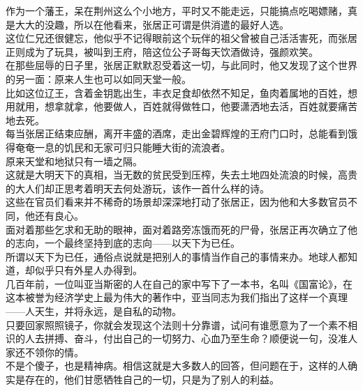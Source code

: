 \begin{multicols}{\theparacolNo}
作为一个藩王，呆在荆州这么个小地方，平时又不能走远，只能搞点吃喝嫖赌，真是大大的没趣，所以在他看来，张居正可谓是供消遣的最好人选。\\

这位仁兄还很健忘，他似乎不记得眼前这个玩伴的祖父曾被自己活活害死，而张居正则成为了玩具，被叫到王府，陪这位公子哥每天饮酒做诗，强颜欢笑。\\

在那些屈辱的日子里，张居正默默忍受着这一切，与此同时，他又发现了这个世界的另一面：原来人生也可以如同天堂一般。\\

比如这位辽王，含着金钥匙出生，丰衣足食却依然不知足，鱼肉着属地的百姓，想用就用，想拿就拿，他要做人，百姓就得做牲口，他要潇洒地去活，百姓就要痛苦地去死。\\

每当张居正结束应酬，离开丰盛的酒席，走出金碧辉煌的王府门口时，总能看到饿得奄奄一息的饥民和无家可归只能睡大街的流浪者。\\

原来天堂和地狱只有一墙之隔。\\

这就是大明天下的真相，当无数的贫民受到压榨，失去土地四处流浪的时候，高贵的大人们却正思考着明天去何处游玩，该作一首什么样的诗。\\

这些在官员们看来并不稀奇的场景却深深地打动了张居正，因为他和大多数官员不同，他还有良心。\\

面对着那些乞求和无助的眼神，面对着路旁冻饿而死的尸骨，张居正再次确立了他的志向，一个最终坚持到底的志向——以天下为已任。\\

所谓以天下为已任，通俗点说就是把别人的事情当作自己的事情来办。地球人都知道，却似乎只有外星人办得到。\\

几百年前，一位叫亚当斯密的人在自己的家中写下了一本书，名叫《国富论》，在这本被誉为经济学史上最为伟大的著作中，亚当同志为我们指出了这样一个真理——人天生，并将永远，是自私的动物。\\

只要回家照照镜子，你就会发现这个法则十分靠谱，试问有谁愿意为了一个素不相识的人去拼搏、奋斗，付出自己的一切努力、心血乃至生命？顺便说一句，没准人家还不领你的情。\\

不是个傻子，也是精神病。相信这就是大多数人的回答，但问题在于，这样的人确实是存在的，他们甘愿牺牲自己的一切，只是为了别人的利益。\\


\end{multicols}
